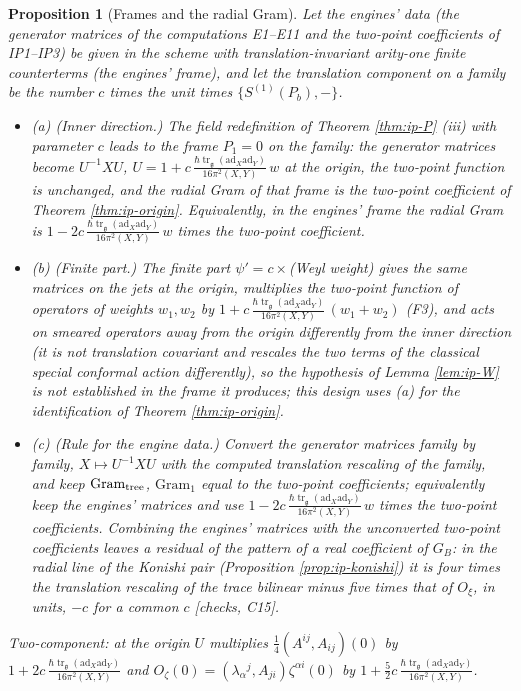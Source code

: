 \documentclass[11pt]{report}
\theoremstyle{plain}
\newtheorem{proposition}[theorem]{Proposition}
\theoremstyle{definition}
\numberwithin{equation}{chapter}
\newcommand{\unit}{\tfrac{\hbar\operatorname{tr}_{\mathfrak g}(\mathrm{ad}_X\mathrm{ad}_Y)}{16\pi^2(X,Y)}}
\newcommand{\Gt}{\mathrm{Gram}_{\rm tree}}
\newcommand{\Go}{\mathrm{Gram}_{1}}
\begin{document}
\begin{proposition}[Frames and the radial Gram]
\label{prop:ip-frames}
Let the engines' data (the generator matrices of the computations E1--E11 and the two-point coefficients of IP1--IP3) be given in the scheme with translation-invariant arity-one finite counterterms (the engines' frame), and let the translation component on a family be the number $c$ times the unit times $\{S^{(1)}(P_b),-\}$.
\begin{itemize}
\item (a) (Inner direction.) The field redefinition of Theorem \ref{thm:ip-P} (iii) with parameter $c$ leads to the frame $P_1=0$ on the family: the generator matrices become $U^{-1}XU$, $U=1+c\,\unit\,w$ at the origin, the two-point function is unchanged, and the radial Gram of that frame is the two-point coefficient of Theorem \ref{thm:ip-origin}. Equivalently, in the engines' frame the radial Gram is $1-2c\,\unit\,w$ times the two-point coefficient.
\item (b) (Finite part.) The finite part $\psi'=c\times$(Weyl weight) gives the same matrices on the jets at the origin, multiplies the two-point function of operators of weights $w_1,w_2$ by $1+c\,\unit\,(w_1+w_2)$ (F3), and acts on smeared operators away from the origin differently from the inner direction (it is not translation covariant and rescales the two terms of the classical special conformal action differently), so the hypothesis of Lemma \ref{lem:ip-W} is not established in the frame it produces; this design uses (a) for the identification of Theorem \ref{thm:ip-origin}.
\item (c) (Rule for the engine data.) Convert the generator matrices family by family, $X\mapsto U^{-1}XU$ with the computed translation rescaling of the family, and keep $\Gt$, $\Go$ equal to the two-point coefficients; equivalently keep the engines' matrices and use $1-2c\,\unit\,w$ times the two-point coefficients. Combining the engines' matrices with the unconverted two-point coefficients leaves a residual of the pattern of a real coefficient of $G_B$: in the radial line of the Konishi pair (Proposition \ref{prop:ip-konishi}) it is four times the translation rescaling of the trace bilinear minus five times that of $O_\xi$, in units, $-c$ for a common $c$ [checks, C15].
\end{itemize}
Two-component: at the origin $U$ multiplies $\tfrac14(A^{ij},A_{ij})(0)$ by $1+2c\,\unit$ and $O_\zeta(0)=(\lambda_\alpha{}^j,A_{ji})\zeta^{\alpha i}(0)$ by $1+\tfrac52c\,\unit$.
\end{proposition}
\end{document}
